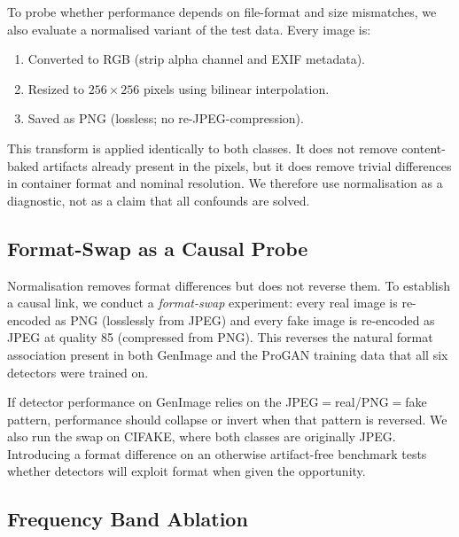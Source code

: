 \documentclass{bmvc2k}
\begin{document}
To probe whether performance depends on file-format and size mismatches, we also evaluate a normalised variant of the test data. Every image is:
\begin{enumerate}
  \item Converted to RGB (strip alpha channel and EXIF metadata).
  \item Resized to $256 \times 256$ pixels using bilinear interpolation.
  \item Saved as PNG (lossless; no re-JPEG-compression).
\end{enumerate}
This transform is applied identically to both classes. It does not remove content-baked artifacts already present in the pixels, but it does remove trivial differences in container format and nominal resolution. We therefore use normalisation as a diagnostic, not as a claim that all confounds are solved.

\subsection{Format-Swap as a Causal Probe}
\label{sec:swap_method}

Normalisation removes format differences but does not reverse them. To establish a causal link, we conduct a \emph{format-swap} experiment: every real image is re-encoded as PNG (losslessly from JPEG) and every fake image is re-encoded as JPEG at quality 85 (compressed from PNG). This reverses the natural format association present in both GenImage and the ProGAN training data that all six detectors were trained on.

If detector performance on GenImage relies on the JPEG$=$real/PNG$=$fake pattern, performance should collapse or invert when that pattern is reversed. We also run the swap on CIFAKE, where both classes are originally JPEG. Introducing a format difference on an otherwise artifact-free benchmark tests whether detectors will exploit format when given the opportunity.

\subsection{Frequency Band Ablation}
\label{sec:ablation_method}
\end{document}
